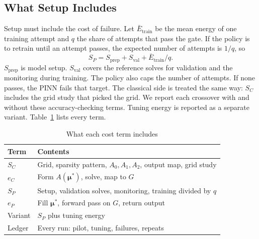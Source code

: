 \documentclass[conference]{IEEEtran}
\begin{document}
\subsection{What Setup Includes}
Setup must include the cost of failure. Let $\bar E_{\mathrm{train}}$ be the mean energy of one training attempt and $q$ the share of attempts that pass the gate. If the policy is to retrain until an attempt passes, the expected number of attempts is $1/q$, so
\begin{equation}
S_P=S_{\mathrm{prep}}+S_{\mathrm{val}}+\bar E_{\mathrm{train}}/q .
\label{eq:retry}
\end{equation}
$S_{\mathrm{prep}}$ is model setup. $S_{\mathrm{val}}$ covers the reference solves for validation and the monitoring during training. The policy also caps the number of attempts. If none passes, the PINN fails that target. The classical side is treated the same way: $S_C$ includes the grid study that picked the grid. We report each crossover with and without these accuracy-checking terms. Tuning energy is reported as a separate variant. Table~\ref{tab:terms} lists every term.

\begin{table}[t]
\caption{What each cost term includes}
\label{tab:terms}
\centering
\footnotesize
\setlength{\tabcolsep}{3pt}
\begin{tabular}{@{}lp{6.4cm}@{}}
\toprule
Term & Contents \\
\midrule
$S_C$ & Grid, sparsity pattern, $A_0,A_1,A_2$, output map, grid study \\
$e_C$ & Form $A(\boldsymbol{\mu}^\ast)$, solve, map to $G$ \\
$S_P$ & Setup, validation solves, monitoring, training divided by $q$ \\
$e_P$ & Fill $\boldsymbol{\mu}^\ast$, forward pass on $G$, return output \\
Variant & $S_P$ plus tuning energy \\
Ledger & Every run: pilot, tuning, failures, repeats \\
\bottomrule
\end{tabular}
\end{table}
\end{document}
